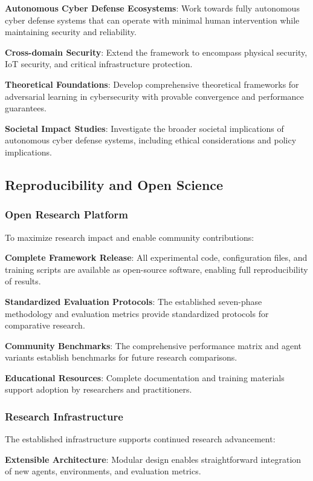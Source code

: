 \documentclass[11pt]{article}
\newcounter{phase}[algorithm]
\theoremstyle{definition}
\theoremstyle{plain}
\begin{document}
\textbf{Autonomous Cyber Defense Ecosystems}: Work towards fully autonomous cyber defense systems that can operate with minimal human intervention while maintaining security and reliability.

\textbf{Cross-domain Security}: Extend the framework to encompass physical security, IoT security, and critical infrastructure protection.

\textbf{Theoretical Foundations}: Develop comprehensive theoretical frameworks for adversarial learning in cybersecurity with provable convergence and performance guarantees.

\textbf{Societal Impact Studies}: Investigate the broader societal implications of autonomous cyber defense systems, including ethical considerations and policy implications.

\subsection{Reproducibility and Open Science}

\subsubsection{Open Research Platform}
To maximize research impact and enable community contributions:

\textbf{Complete Framework Release}: All experimental code, configuration files, and training scripts are available as open-source software, enabling full reproducibility of results.

\textbf{Standardized Evaluation Protocols}: The established seven-phase methodology and evaluation metrics provide standardized protocols for comparative research.

\textbf{Community Benchmarks}: The comprehensive performance matrix and agent variants establish benchmarks for future research comparisons.

\textbf{Educational Resources}: Complete documentation and training materials support adoption by researchers and practitioners.

\subsubsection{Research Infrastructure}
The established infrastructure supports continued research advancement:

\textbf{Extensible Architecture}: Modular design enables straightforward integration of new agents, environments, and evaluation metrics.
\end{document}
